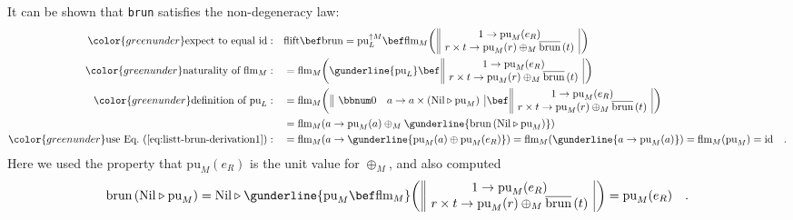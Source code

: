 It can be shown that \lstinline!brun! satisfies the non-degeneracy
law:
\begin{align*}
{\color{greenunder}\text{expect to equal }\text{id}:}\quad & \text{flift}\bef\text{brun}=\text{pu}_{L}^{\uparrow M}\bef\text{flm}_{M}\bigg(\,\begin{array}{||c|}
1\rightarrow\text{pu}_{M}(e_{R})\\
r\times t\rightarrow\text{pu}_{M}(r)\oplus_{M}\overline{\text{brun}}\,(t)
\end{array}\,\bigg)\\
{\color{greenunder}\text{naturality of }\text{flm}_{M}:}\quad & =\text{flm}_{M}\bigg(\gunderline{\text{pu}_{L}}\bef\,\begin{array}{||c|}
1\rightarrow\text{pu}_{M}(e_{R})\\
r\times t\rightarrow\text{pu}_{M}(r)\oplus_{M}\overline{\text{brun}}\,(t)
\end{array}\,\bigg)\\
{\color{greenunder}\text{definition of }\text{pu}_{L}:}\quad & =\text{flm}_{M}\bigg(\,\begin{array}{||cc|}
\bbnum 0 & a\rightarrow a\times(\text{Nil}\triangleright\text{pu}_{M})\end{array}\,\bef\,\begin{array}{||c|}
1\rightarrow\text{pu}_{M}(e_{R})\\
r\times t\rightarrow\text{pu}_{M}(r)\oplus_{M}\overline{\text{brun}}\,(t)
\end{array}\,\bigg)\\
 & =\text{flm}_{M}(a\rightarrow\text{pu}_{M}(a)\oplus_{M}\gunderline{\text{brun}\,(\text{Nil}\triangleright\text{pu}_{M})})\\
{\color{greenunder}\text{use Eq.~(\ref{eq:listt-brun-derivation1})}:}\quad & =\text{flm}_{M}(a\rightarrow\gunderline{\text{pu}_{M}(a)\oplus\text{pu}_{M}(e_{R})})=\text{flm}_{M}(\gunderline{a\rightarrow\text{pu}_{M}(a)})=\text{flm}_{M}(\text{pu}_{M})=\text{id}\quad.
\end{align*}
Here we used the property that $\text{pu}_{M}(e_{R})$ is the unit
value for $\oplus_{M}$, and also computed
\begin{equation}
\text{brun}\,(\text{Nil}\triangleright\text{pu}_{M})=\text{Nil}\triangleright\gunderline{\text{pu}_{M}\bef\text{flm}_{M}}\bigg(\,\begin{array}{||c|}
1\rightarrow\text{pu}_{M}(e_{R})\\
r\times t\rightarrow\text{pu}_{M}(r)\oplus_{M}\overline{\text{brun}}\,(t)
\end{array}\,\bigg)=\text{pu}_{M}(e_{R})\quad.\label{eq:listt-brun-derivation1}
\end{equation}

